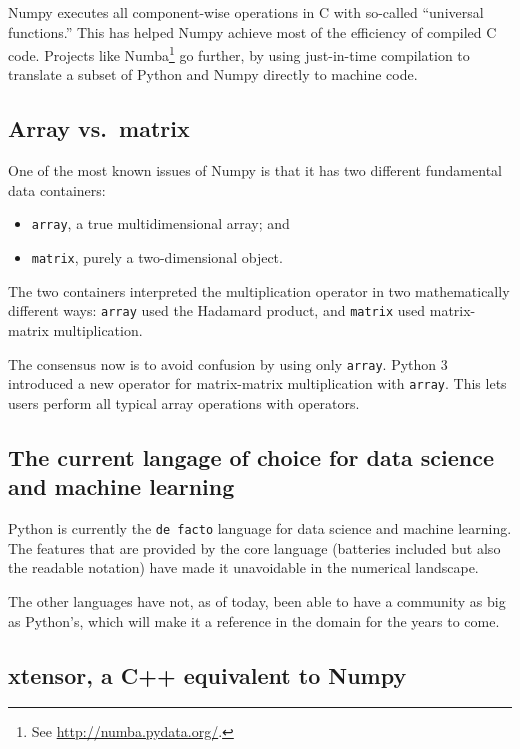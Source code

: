 Numpy executes all component-wise operations in C with so-called
``universal functions.''  This has helped Numpy achieve most of the
efficiency of compiled C code.  Projects like Numba\footnote{See
  \url{http://numba.pydata.org/}.} go further, by using just-in-time
compilation to translate a subset of Python and Numpy directly to
machine code.

\subsection{Array vs.\ matrix}
\label{S:Python:arraymatrix}

One of the most known issues of Numpy is that it has two different
fundamental data containers:
\begin{itemize}
\item \texttt{array}, a true multidimensional array; and
\item \texttt{matrix}, purely a two-dimensional object.
\end{itemize}
The two containers interpreted the multiplication operator in two
mathematically different ways: \texttt{array} used the Hadamard
product, and \texttt{matrix} used matrix-matrix multiplication.

The consensus now is to avoid confusion by using only \texttt{array}.
Python 3 introduced a new operator for matrix-matrix multiplication
with \texttt{array}.  This lets users perform all typical array
operations with operators.

\subsection{The current langage of choice for data science and machine learning}
\label{S:Python:currentlanguage}

Python is currently the \texttt{de facto} language for data science and
 machine learning. The features that are provided by the core language
 (batteries included but also the readable notation) have made it
 unavoidable in the numerical landscape.

 The other languages have not, as of today, been able to have
  a community as big as Python's, which will make it a reference in the
  domain for the years to come.

\subsection{xtensor, a C++ equivalent to Numpy}
\label{S:Python:xtensor}

